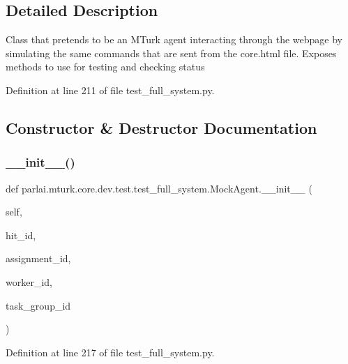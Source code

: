 \subsection{Detailed Description}
\begin{DoxyVerb}Class that pretends to be an MTurk agent interacting through the
webpage by simulating the same commands that are sent from the core.html
file. Exposes methods to use for testing and checking status
\end{DoxyVerb}
 

Definition at line 211 of file test\+\_\+full\+\_\+system.\+py.



\subsection{Constructor \& Destructor Documentation}
\mbox{\label{classparlai_1_1mturk_1_1core_1_1dev_1_1test_1_1test__full__system_1_1MockAgent_ae2c5906fb77600feb2d4c8d1ede4e415}} 
\subsubsection{\texorpdfstring{\+\_\+\+\_\+init\+\_\+\+\_\+()}{\_\_init\_\_()}}
{\footnotesize\ttfamily def parlai.\+mturk.\+core.\+dev.\+test.\+test\+\_\+full\+\_\+system.\+Mock\+Agent.\+\_\+\+\_\+init\+\_\+\+\_\+ (\begin{DoxyParamCaption}\item[{}]{self,  }\item[{}]{hit\+\_\+id,  }\item[{}]{assignment\+\_\+id,  }\item[{}]{worker\+\_\+id,  }\item[{}]{task\+\_\+group\+\_\+id }\end{DoxyParamCaption})}



Definition at line 217 of file test\+\_\+full\+\_\+system.\+py.



